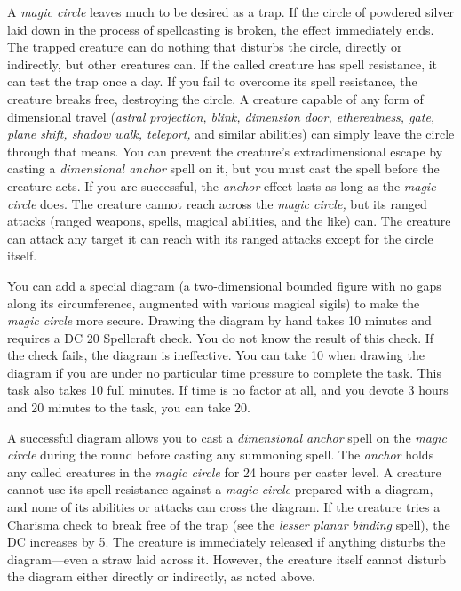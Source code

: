 \documentclass{article}
\begin{document}
A \textit{magic circle }leaves much to be desired as a trap. If the circle of powdered 
silver laid down in the process of spellcasting is broken, the effect immediately 
ends. The trapped creature can do nothing that disturbs the circle, directly or 
indirectly, but other creatures can. If the called creature has spell resistance, 
it can test the trap once a day. If you fail to overcome its spell resistance, 
the creature breaks free, destroying the circle. A creature capable of any form 
of dimensional travel (\textit{astral projection, blink, dimension door, etherealness, 
gate, plane shift, shadow walk, teleport, }and similar abilities) can simply leave 
the circle through that means. You can prevent the creature's extradimensional 
escape by casting a \textit{dimensional anchor }spell on it, but you must cast 
the spell before the creature acts. If you are successful, the \textit{anchor }effect 
lasts as long as the \textit{magic circle }does. The creature cannot reach across 
the \textit{magic circle, }but its ranged attacks (ranged weapons, spells, magical 
abilities, and the like) can. The creature can attack any target it can reach with 
its ranged attacks except for the circle itself.

You can add a special diagram (a two-dimensional bounded figure with no gaps along 
its circumference, augmented with various magical sigils) to make the \textit{magic 
circle }more secure. Drawing the diagram by hand takes 10 minutes and requires 
a DC 20 Spellcraft check. You do not know the result of this check. If the check 
fails, the diagram is ineffective. You can take 10 when drawing the diagram if 
you are under no particular time pressure to complete the task. This task also 
takes 10 full minutes. If time is no factor at all, and you devote 3 hours and 
20 minutes to the task, you can take 20.

A successful diagram allows you to cast a \textit{dimensional anchor }spell on 
the \textit{magic circle }during the round before casting any summoning spell. 
The \textit{anchor }holds any called creatures in the \textit{magic circle }for 
24 hours per caster level. A creature cannot use its spell resistance against a 
\textit{magic circle }prepared with a diagram, and none of its abilities or attacks 
can cross the diagram. If the creature tries a Charisma check to break free of 
the trap (see the \textit{lesser planar binding }spell), the DC increases by 5. 
The creature is immediately released if anything disturbs the diagram---even a 
straw laid across it. However, the creature itself cannot disturb the diagram either 
directly or indirectly, as noted above.
\end{document}
